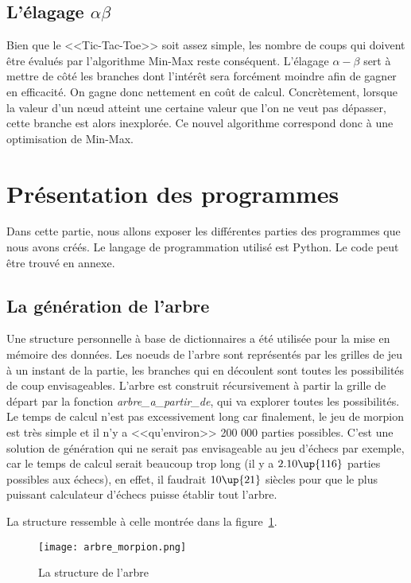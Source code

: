 \documentclass{article}
\begin{document}
\subsection{L'élagage $\alpha \beta$}

Bien que le <<Tic-Tac-Toe>> soit assez simple, les nombre de coups qui doivent être évalués par l'algorithme Min-Max reste conséquent. L'élagage $\alpha{} - \beta{}$ sert à mettre de côté les branches dont l'intérêt sera forcément moindre afin de gagner en efficacité. On gagne donc nettement en coût de calcul. Concrètement, lorsque la valeur d'un nœud atteint une certaine valeur que l'on ne veut pas dépasser, cette branche est alors inexplorée. Ce nouvel algorithme correspond donc à une optimisation de Min-Max.


\section{Présentation des programmes}

Dans cette partie, nous allons exposer les différentes parties des programmes que nous avons créés. Le langage de programmation utilisé est Python. Le code peut être trouvé en annexe.

\subsection{La génération de l'arbre}

Une structure personnelle à base de dictionnaires a été utilisée pour la mise en mémoire des données. Les noeuds de l'arbre sont représentés par les grilles de jeu à un instant de la partie, les branches qui en découlent sont toutes les possibilités de coup envisageables. L'arbre est construit récursivement à partir la grille de départ par la fonction \emph{arbre\_a\_partir\_de}, qui va explorer toutes les possibilités. Le temps de calcul n'est pas excessivement long car finalement, le jeu de morpion est très simple et il n'y a <<qu'environ>> 200 000 parties possibles. C'est une solution de génération qui ne serait pas envisageable au jeu d'échecs par exemple, car le temps de calcul serait beaucoup trop long (il y a $2.10\up{116}$ parties possibles aux échecs), en effet, il faudrait $10\up{21}$ siècles pour que le plus puissant calculateur d'échecs puisse établir tout l'arbre.

La structure ressemble à celle montrée dans la figure~\ref{tree}.

\begin{figure}[!h]
\centering
\texttt{[image: arbre\_morpion.png]}
\caption{La structure de l'arbre}
\label{tree}
\end{figure}
\end{document}

